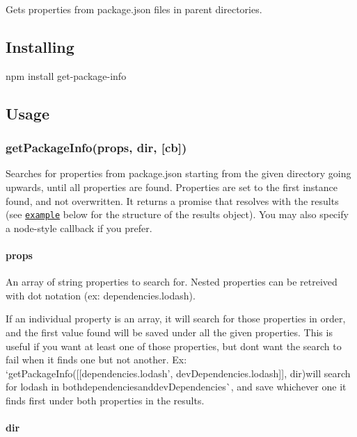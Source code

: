 Gets properties from package.\+json files in parent directories.

\subsection*{Installing}

{\ttfamily npm install get-\/package-\/info}

\subsection*{Usage}

\subsubsection*{{\ttfamily get\+Package\+Info(props, dir, \mbox{[}cb\mbox{]})}}

Searches for properties from package.\+json starting from the given directory going upwards, until all properties are found. Properties are set to the first instance found, and not overwritten. It returns a promise that resolves with the results (see \href{#Example}{\tt example} below for the structure of the results object). You may also specify a node-\/style callback if you prefer.

\paragraph*{{\ttfamily props}}

An array of string properties to search for. Nested properties can be retreived with dot notation (ex\+: {\ttfamily dependencies.\+lodash}).

If an individual property is an array, it will search for those properties in order, and the first value found will be saved under all the given properties. This is useful if you want at least one of those properties, but don\textquotesingle{}t want the search to fail when it finds one but not another. Ex\+: `get\+Package\+Info(\mbox{[}\mbox{[}\textquotesingle{}dependencies.\+lodash', \textquotesingle{}dev\+Dependencies.\+lodash\textquotesingle{}\mbox{]}\mbox{]}, dir){\ttfamily will search for lodash in both}dependencies{\ttfamily and}dev\+Dependencies\`{}, and save whichever one it finds first under both properties in the results.

\paragraph*{{\ttfamily dir}}

